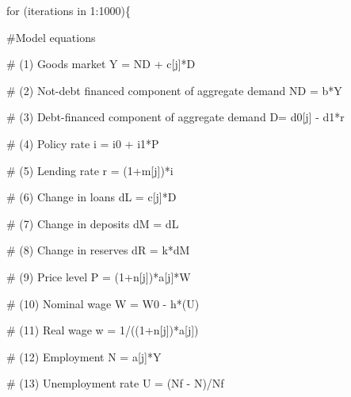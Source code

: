 \documentclass[
  letterpaper,
  DIV=11,
  numbers=noendperiod]{scrreprt}
\newenvironment{Shaded}{\begin{snugshade}}{\end{snugshade}}
\newcommand{\CommentTok}[1]{\textcolor[rgb]{0.37,0.37,0.37}{#1}}
\newcommand{\ControlFlowTok}[1]{\textcolor[rgb]{0.00,0.23,0.31}{#1}}
\newcommand{\DecValTok}[1]{\textcolor[rgb]{0.68,0.00,0.00}{#1}}
\newcommand{\NormalTok}[1]{\textcolor[rgb]{0.00,0.23,0.31}{#1}}
\newcommand{\OtherTok}[1]{\textcolor[rgb]{0.00,0.23,0.31}{#1}}
\newcommand{\SpecialCharTok}[1]{\textcolor[rgb]{0.37,0.37,0.37}{#1}}
\begin{document}
\begin{Shaded}
\begin{Highlighting}[]
  \ControlFlowTok{for}\NormalTok{ (iterations }\ControlFlowTok{in} \DecValTok{1}\SpecialCharTok{:}\DecValTok{1000}\NormalTok{)\{}
    
    \CommentTok{\#Model equations}
    
    \CommentTok{\# (1) Goods market}
\NormalTok{    Y }\OtherTok{=}\NormalTok{ ND }\SpecialCharTok{+}\NormalTok{ c[j]}\SpecialCharTok{*}\NormalTok{D}
    
    \CommentTok{\# (2) Not{-}debt financed component of aggregate demand}
\NormalTok{    ND }\OtherTok{=}\NormalTok{ b}\SpecialCharTok{*}\NormalTok{Y}
    
    \CommentTok{\# (3) Debt{-}financed component of aggregate demand}
\NormalTok{    D}\OtherTok{=}\NormalTok{ d0[j] }\SpecialCharTok{{-}}\NormalTok{ d1}\SpecialCharTok{*}\NormalTok{r}
    
    \CommentTok{\# (4) Policy rate}
\NormalTok{    i }\OtherTok{=}\NormalTok{ i0 }\SpecialCharTok{+}\NormalTok{ i1}\SpecialCharTok{*}\NormalTok{P}
    
    \CommentTok{\# (5) Lending rate}
\NormalTok{    r }\OtherTok{=}\NormalTok{ (}\DecValTok{1}\SpecialCharTok{+}\NormalTok{m[j])}\SpecialCharTok{*}\NormalTok{i}
    
    \CommentTok{\# (6) Change in loans}
\NormalTok{    dL }\OtherTok{=}\NormalTok{ c[j]}\SpecialCharTok{*}\NormalTok{D}
    
    \CommentTok{\# (7) Change in deposits}
\NormalTok{    dM }\OtherTok{=}\NormalTok{ dL}
    
    \CommentTok{\# (8) Change in reserves}
\NormalTok{    dR }\OtherTok{=}\NormalTok{ k}\SpecialCharTok{*}\NormalTok{dM}
    
    \CommentTok{\# (9) Price level}
\NormalTok{    P }\OtherTok{=}\NormalTok{ (}\DecValTok{1}\SpecialCharTok{+}\NormalTok{n[j])}\SpecialCharTok{*}\NormalTok{a[j]}\SpecialCharTok{*}\NormalTok{W}
    
    \CommentTok{\# (10) Nominal wage}
\NormalTok{    W }\OtherTok{=}\NormalTok{ W0 }\SpecialCharTok{{-}}\NormalTok{ h}\SpecialCharTok{*}\NormalTok{(U)}
    
    \CommentTok{\# (11) Real wage}
\NormalTok{    w }\OtherTok{=} \DecValTok{1}\SpecialCharTok{/}\NormalTok{((}\DecValTok{1}\SpecialCharTok{+}\NormalTok{n[j])}\SpecialCharTok{*}\NormalTok{a[j])}
    
    \CommentTok{\# (12) Employment}
\NormalTok{    N }\OtherTok{=}\NormalTok{ a[j]}\SpecialCharTok{*}\NormalTok{Y}
    
    \CommentTok{\# (13) Unemployment rate}
\NormalTok{    U }\OtherTok{=}\NormalTok{ (Nf }\SpecialCharTok{{-}}\NormalTok{ N)}\SpecialCharTok{/}\NormalTok{Nf}
    

\end{Highlighting}
\end{Shaded}
\end{document}
